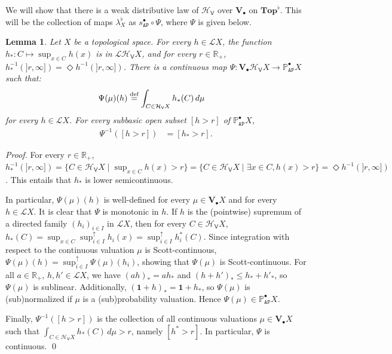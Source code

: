 \documentclass[preprint,12pt]{elsarticle}
\newcommand\eqdef{\mathrel{\buildrel \text{def}\over=}}
\newcommand{\Rp}{\mathbb{R}_+}
\newcommand\Lform{\mathcal L}
\newcommand\Pred{\mathbb{P}}
\newcommand\Angel{{\mathtt{A}}}
\newcommand\Nature{{\mathtt{P}}}
\newcommand\AN{{\Angel\Nature}}
\newcommand\one{\mathbf 1}
\newcommand\Hoare{{\mathcal H}}
\newcommand\Vt{\mathsf{V}}
\newcommand\HV{\Hoare_\Vt}
\newcommand\Val{{\mathbf V}}
\newcommand\Topcat{\mathbf{Top}}
\newcommand\dsup{\sup\nolimits^{\scriptstyle\uparrow}}
\newtheorem{lemma}[theorem]{Lemma}
\begin{document}
We will show that there is a weak distributive law of $\HV$ over
$\Val_\bullet$ on $\Topcat^\flat$.  This will be the collection of
maps ${\lambda^\flat_X}$ as $s_\AN^\bullet \circ \Psi$,
where $\Psi$ is given below.

\begin{lemma}
  \label{lemma:Psi}
  Let $X$ be a topological space.  For every $h \in \Lform X$, the
  function $h_* \colon C \mapsto \sup_{x \in C} h (x)$ is in
  $\Lform {\HV X}$, and for every $r \in \Rp$,
  $h_*^{-1} (]r, \infty]) = \Diamond {h^{-1} (]r, \infty])}$.  There
  is a continuous map
  $\Psi \colon \Val_\bullet {\HV X} \to \Pred_\AN^\bullet X$ such
  that:
  \begin{align*}
    \Psi (\mu) (h) & \eqdef \int_{C \in \HV X} h_* (C) \,d\mu
  \end{align*}
  for every $h \in \Lform X$.  For every subbasic open subset
  $[h > r]$ of $\Pred_\AN^\bullet X$,
  \begin{align*}
    \Psi^{-1} ([h > r]) & = [h_* > r].
  \end{align*}
\end{lemma}
\begin{proof}
  For every $r \in \Rp$, $h_*^{-1} (]r, \infty]) = \{C \in \HV X \mid
  \sup_{x \in C} h (x) > r\} = \{C \in \HV X \mid \exists x \in C, h
  (x) > r\} = \Diamond {h^{-1} (]r, \infty])}$.  This entails that
  $h_*$ is lower semicontinuous.

  In particular, $\Psi (\mu) (h)$ is well-defined for every
  $\mu \in \Val_\bullet X$ and for every $h \in \Lform X$.  It is
  clear that $\Psi$ is monotonic in $h$.  If $h$ is the (pointwise)
  supremum of a directed family ${(h_i)}_{i \in I}$ in $\Lform X$,
  then for every $C \in \HV X$,
  $h_* (C) = \sup_{x \in C} \dsup_{i \in I} h_i (x) = \dsup_{i \in I}
  h_i^* (C)$.  Since integration with respect to the continuous
  valuation $\mu$ is Scott-continuous,
  $\Psi (\mu) (h) = \dsup_{i \in I} \Psi (\mu) (h_i)$, showing that
  $\Psi (\mu)$ is Scott-continuous.  For all $a \in \Rp$,
  $h, h' \in \Lform X$, we have $(ah)_* = a h_*$ and
  $(h+h')_* \leq h_* + {h'}_*$, so $\Psi (\mu)$ is sublinear.
  Additionally, $(\one + h)_* = \one + h_*$, so $\Psi (\mu)$ is
  (sub)normalized if $\mu$ is a (sub)probability valuation.  Hence
  $\Psi (\mu) \in \Pred_\AN^\bullet X$.

  Finally, $\Psi^{-1} ([h > r])$ is the collection of all continuous
  valuations $\mu \in \Val_\bullet X$ such that
  $\int_{C \in \HV X} h_* (C) \,d\mu > r$, namely $[h^* > r]$.  In
  particular, $\Psi$ is continuous.  \qed
\end{proof}
\end{document}
